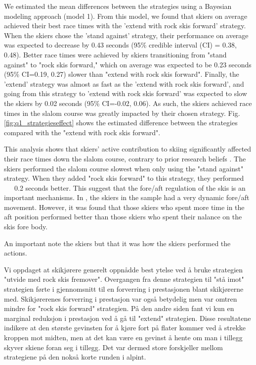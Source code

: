 \documentclass[letterpaper,10pt]{article}
\begin{document}
We estimated the mean differences between the strategies using a Bayesian modeling approach (model 1). From this model, we found that skiers on average achieved their best race times with the 'extend with rock skis forward' strategy. When the skiers chose the 'stand against' strategy, their performance on average was expected to decrease by 0.43 seconds (95\% credible interval (CI) = 0.38, 0.48). Better race times were achieved by skiers transitioning from "stand against" to "rock skis forward," which on average was expected to be 0.23 seconds  (95\% CI=0.19, 0.27) slower than "extend with rock skis forward".  Finally, the 'extend' strategy was almost as fast as the 'extend with rock skis forward', and going from this strategy to 'extend with rock skis forward' was expected to slow the skiers by 0.02 seconds (95\% CI=-0.02, 0.06). As such, the skiers achieved race times in the slalom course was greatly impacted by their chosen strategy. Fig. \ref{fig:q1_strategieseffect} shows the estimated difference between the strategies compared with the "extend with rock skis forward".

This analysis shows that skiers' active contribution to skiing significantly affected their race times down the slalom course, contrary to prior research beliefs \cite{supej_differential_2008}. The skiers performed the slalom course slowest when only using the "stand against" strategy. When they added "rock skis forward" to this strategy, they performed ~~~0.2 seconds better. This suggest that the fore/aft regulation of the skis is an important mechanisms. In \cite{reid_kinematic_2010}, the skiers in the sample had a very dynamic fore/aft movement. However, it was found that those skiers who spent more time in the aft position performed better than those skiers who spent their nalance on the skis fore body. 

An important note the skiers but that it was how the skiers performed the actions. 

 





 




Vi oppdaget at skikjørere generelt oppnådde best ytelse ved å bruke strategien "utvide med rock skis fremover". Overgangen fra denne strategien til "stå imot" strategien førte i gjennomsnitt til en forverring i prestasjonen blant skikjørerne med. Skikjørerenes forverring i prestasjon var også betydelig men var omtren mindre for "rock skis forward" strategien. På den andre siden fant vi kun en marginal reduksjon i prestasjon ved å gå til "extend" strategien. Disse resultatene indikere at den største gevinsten for å kjøre fort på flater kommer ved å strekke kroppen mot midten, men at det kan være en gevinst å hente om man i tillegg skyver skiene foran seg i tillegg. Det var dermed store forskjeller mellom strategiene på den nokså korte runden i alpint.
\end{document}
